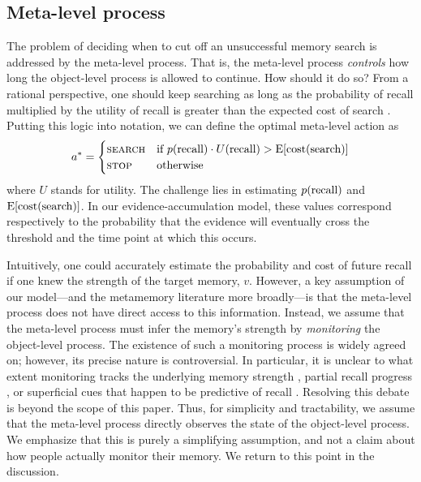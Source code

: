 \subsection{Meta-level process}
The problem of deciding when to cut off an unsuccessful memory search is addressed by the meta-level process. That is, the meta-level process \emph{controls} how long the object-level process is allowed to continue. How should it do so? From a rational perspective, one should keep searching as long as the probability of recall multiplied by the utility of recall is greater than the expected cost of search \citep{anderson1989human}. Putting this logic into notation, we can define the optimal meta-level action as
%
\begin{equation}\label{eq:anderson}
  a^* = \begin{cases}
    \textsc{search} & \text{if } p({\text{recall}}) \cdot U({\text{recall}}) > \operatorname*{E} [\text{cost}(\text{search})] \\
    \textsc{stop} & \text{otherwise}
  \end{cases}
\end{equation}
%
where $U$ stands for utility. The challenge lies in estimating $p({\text{recall}})$ and $\operatorname*{E}[\text{cost}(\text{search})]$. In our evidence-accumulation model, these values correspond respectively to the probability that the evidence will eventually cross the threshold and the time point at which this occurs. 

Intuitively, one could accurately estimate the probability and cost of future recall if one knew the strength of the target memory, $v$. However, a key assumption of our model---and the metamemory literature more broadly---is that the meta-level process does not have direct access to this information. Instead, we assume that the meta-level process must infer the memory's strength by \emph{monitoring} the object-level process. The existence of such a monitoring process is widely agreed on; however, its precise nature is controversial. In particular, it is unclear to what extent monitoring tracks the underlying memory strength \citep{hart1965memory}, partial recall progress \citep{koriat1993how}, or superficial cues that happen to be predictive of recall \citep{reder1992determines,schwartz1992cue}. Resolving this debate is beyond the scope of this paper. Thus, for simplicity and tractability, we assume that the meta-level process directly observes the state of the object-level process. We emphasize that this is purely a simplifying assumption, and not a claim about how people actually monitor their memory. We return to this point in the discussion.

